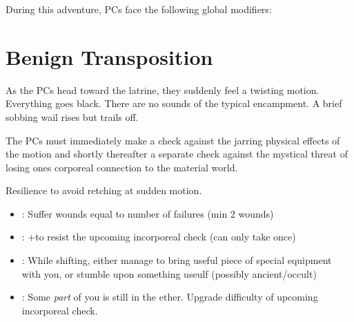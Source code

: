 \documentclass{book}
\newcommand{\spa}{\hskip 0.3em }
\newcommand{\df}{\DifficultyDie }
\newcommand{\stb}{\SetbackDie }
\newcommand{\ch}{\ChallengeDie }
\newcommand{\bbb}{\BoostDie }
\begin{document}
\begin{multicols}{2}
    During this adventure, PCs face the following global modifiers:


\section{Benign Transposition}

As the PCs head toward the latrine, they suddenly feel a twisting motion.  Everything goes black.  There are no sounds of the typical encampment.  A brief sobbing wail rises but trails off.

The PCs must immediately make a check against the jarring physical effects of the motion and shortly thereafter a separate check against the mystical threat of losing ones corporeal connection to the material world.

\ch\df Resilience to avoid retching at sudden motion.
    \begin{itemize}
        \item \Failure: Suffer wounds equal to number of failures (min 2 wounds)
        \item \Advantage: +\bbb to resist the upcoming incorporeal check (can only take once)
        \item \Triumph: While shifting, either manage to bring useful piece of special equipment with you, or stumble upon something useulf (possibly ancient/occult)
        \item \Despair: Some \emph{part} of you is still in the ether.  Upgrade difficulty of upcoming incorporeal check.
    \end{itemize}


\end{multicols}
\end{document}
